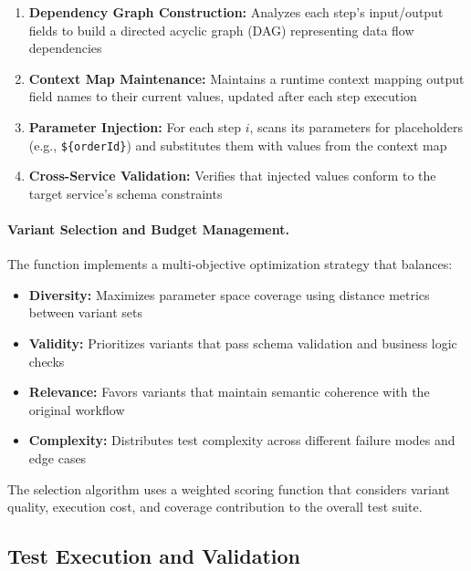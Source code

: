 \begin{enumerate}[leftmargin=*]
  \item \textbf{Dependency Graph Construction:} Analyzes each step's
        input/output fields to build a directed acyclic graph (DAG)
        representing data flow dependencies
  \item \textbf{Context Map Maintenance:} Maintains a runtime context
        mapping output field names to their current values, updated
        after each step execution
  \item \textbf{Parameter Injection:} For each step $i$, scans its
        parameters for placeholders (e.g., \texttt{\$\{orderId\}}) and
        substitutes them with values from the context map
  \item \textbf{Cross-Service Validation:} Verifies that injected
        values conform to the target service's schema constraints
\end{enumerate}

\paragraph{Variant Selection and Budget Management.}
The  function implements a multi-objective
optimization strategy that balances:

\begin{itemize}[leftmargin=*]
  \item \textbf{Diversity:} Maximizes parameter space coverage using
        distance metrics between variant sets
  \item \textbf{Validity:} Prioritizes variants that pass schema
        validation and business logic checks
  \item \textbf{Relevance:} Favors variants that maintain semantic
        coherence with the original workflow
  \item \textbf{Complexity:} Distributes test complexity across
        different failure modes and edge cases
\end{itemize}

The selection algorithm uses a weighted scoring function that considers
variant quality, execution cost, and coverage contribution to the overall
test suite.

\subsection{Test Execution and Validation}
\label{ssec:exec}


